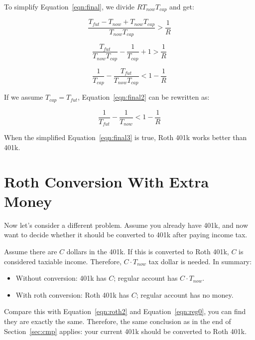 \documentclass[twocolumn]{article}
\begin{document}
To simplify Equation~\ref{eqn:final}, we divide $R T_{now} T_{cap}$ and get:

\begin{equation}
  \frac{T_{fut} - T_{now} + T_{now}T_{cap}}{T_{now} T_{cap}} > \frac{1}{R}
\end{equation}

\begin{equation}
  \frac{T_{fut}}{T_{now}T_{cap}} - \frac{1}{T_{cap}} + 1 > \frac{1}{R}
\end{equation}

\begin{equation}
  \frac{1}{T_{cap}} - \frac{T_{fut}}{T_{now}T_{cap}} < 1 - \frac{1}{R}  \label{eqn:final2}
\end{equation}


If we assume $T_{cap} = T_{fut}$, Equation~\ref{eqn:final2} can be rewritten as:

\begin{equation}
  \frac{1}{T_{fut}} - \frac{1}{T_{now}} < 1 - \frac{1}{R} \label{eqn:final3}
\end{equation}

When the simplified Equation~\ref{eqn:final3} is true, Roth 401k works better than 401k.

\section{Roth Conversion With Extra Money}\label{sec:extra-money}

Now let's consider a different problem. Assume you already have 401k, and now want to decide whether it should be converted to 401k after paying income tax.

Assume there are $C$ dollars in the 401k. If this is converted to Roth 401k, $C$ is considered taxiable income. Therefore, $C \cdot T_{now}$ tax dollar is needed. In summary:

\begin{itemize}
\item Without conversion: 401k has $C$; regular account has $C \cdot T_{now}$.
\item With roth conversion: Roth 401k has $C$; regular account has no money.
\end{itemize}

Compare this with Equation~\ref{eqn:roth2} and Equation~\ref{eqn:reg0}, you can find they are exactly the same. Therefore, the same conclusion as in the end of Section~\ref{sec:cmp} applies: your current 401k should be converted to Roth 401k.
\end{document}

